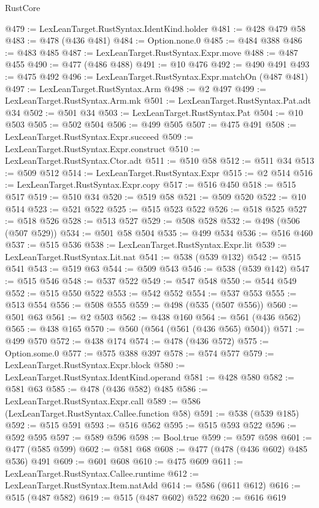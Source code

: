 \begin{lexlean}{RustCore}
\begin{coremodule}
@479 := LexLeanTarget.RustSyntax.IdentKind.holder
@481 := @428 @479 @58
@483 := @478 (@436 @481)
@484 := Option.none.{0}
@485 := @484 @388
@486 := @483 @485
@487 := LexLeanTarget.RustSyntax.Expr.move
@488 := @487 @455
@490 := @477 (@486 @488)
@491 := @10 @476
@492 := @490 @491
@493 := @475 @492
@496 := LexLeanTarget.RustSyntax.Expr.matchOn (@487 @481)
@497 := LexLeanTarget.RustSyntax.Arm
@498 := @2 @497
@499 := LexLeanTarget.RustSyntax.Arm.mk
@501 := LexLeanTarget.RustSyntax.Pat.adt @34
@502 := @501 @34
@503 := LexLeanTarget.RustSyntax.Pat
@504 := @10 @503
@505 := @502 @504
@506 := @499 @505
@507 := @475 @491
@508 := LexLeanTarget.RustSyntax.Expr.succeed
@509 := LexLeanTarget.RustSyntax.Expr.construct
@510 := LexLeanTarget.RustSyntax.Ctor.adt
@511 := @510 @58
@512 := @511 @34
@513 := @509 @512
@514 := LexLeanTarget.RustSyntax.Expr
@515 := @2 @514
@516 := LexLeanTarget.RustSyntax.Expr.copy
@517 := @516 @450
@518 := @515 @517
@519 := @510 @34
@520 := @519 @58
@521 := @509 @520
@522 := @10 @514
@523 := @521 @522
@525 := @515 @523 @522
@526 := @518 @525
@527 := @518 @526
@528 := @513 @527
@529 := @508 @528
@532 := @498 (@506 (@507 @529))
@534 := @501 @58 @504
@535 := @499 @534
@536 := @516 @460
@537 := @515 @536
@538 := LexLeanTarget.RustSyntax.Expr.lit
@539 := LexLeanTarget.RustSyntax.Lit.nat
@541 := @538 (@539 @132)
@542 := @515 @541
@543 := @519 @63
@544 := @509 @543
@546 := @538 (@539 @142)
@547 := @515 @546
@548 := @537 @522
@549 := @547 @548
@550 := @544 @549
@552 := @515 @550 @522
@553 := @542 @552
@554 := @537 @553
@555 := @513 @554
@556 := @508 @555
@559 := @498 (@535 (@507 @556))
@560 := @501 @63
@561 := @2 @503
@562 := @438 @160
@564 := @561 (@436 @562)
@565 := @438 @165
@570 := @560 (@564 (@561 (@436 @565) @504))
@571 := @499 @570
@572 := @438 @174
@574 := @478 (@436 @572)
@575 := Option.some.{0}
@577 := @575 @388 @397
@578 := @574 @577
@579 := LexLeanTarget.RustSyntax.Expr.block
@580 := LexLeanTarget.RustSyntax.IdentKind.operand
@581 := @428 @580
@582 := @581 @63
@585 := @478 (@436 @582) @485
@586 := LexLeanTarget.RustSyntax.Expr.call
@589 := @586 (LexLeanTarget.RustSyntax.Callee.function @58)
@591 := @538 (@539 @185)
@592 := @515 @591
@593 := @516 @562
@595 := @515 @593 @522
@596 := @592 @595
@597 := @589 @596
@598 := Bool.true
@599 := @597 @598
@601 := @477 (@585 @599)
@602 := @581 @68
@608 := @477 (@478 (@436 @602) @485 @536) @491
@609 := @601 @608
@610 := @475 @609
@611 := LexLeanTarget.RustSyntax.Callee.runtime
@612 := LexLeanTarget.RustSyntax.Item.natAdd
@614 := @586 (@611 @612)
@616 := @515 (@487 @582)
@619 := @515 (@487 @602) @522
@620 := @616 @619

\end{coremodule}
\end{lexlean}
